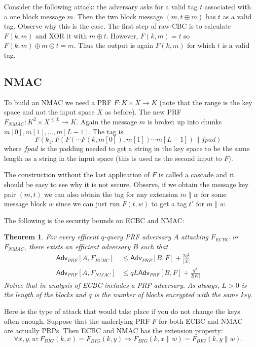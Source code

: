 \documentclass[twoside]{article}
\newcounter{lecnum}
\newtheorem{theorem}{Theorem}[lecnum]
\def\Adv{\mathsf{Adv}}
\def\xor{\oplus}
\begin{document}
Consider the following attack:
the adversary asks for a valid tag $t$ associated with a one block message $m$. Then the two block message $(m, t \xor m)$ has $t$ as a valid tag. Observe why this is the case. The first step of raw-CBC is to calculate $F(k, m)$ and XOR it with $m \xor t$. However, $F(k, m) = t$ so $F(k, m) \xor m \xor t = m$. Thus the output is again $F(k, m)$ for which $t$ is a valid tag.

\subsection{NMAC}

To build an NMAC we need a PRF $F: K \times X \rightarrow K$ (note that the range is the key space and not the input space $X$ as before). The new PRF $F_{NMAC}: K^2 \times X^{\leq L} \rightarrow K$. Again the message $m$ is broken up into chunks $m[0], m[1], ..., m[L-1]$. The tag is
\[F(k_1, F(F(\cdots F(k, m[0]), m[1]) \cdots m[L-1]) \parallel fpad)\]
where $fpad$ is the padding needed to get a string in the key space to be the same length as a string in the input space (this is used as the second input to $F$).

The construction without the last application of $F$ is called a cascade and it should be easy to see why it is not secure. Observe, if we obtain the message key pair $(m, t)$ we can also obtain the tag for any extension $m \parallel w$ for some message block $w$ since we can just run $F(t, w)$ to get a tag $t'$ for $m \parallel w$.

The following is the security bounds on ECBC and NMAC:
\begin{theorem}
For every efficent $q$-query PRF adversary $A$ attacking $F_{ECBC}$ or $F_{NMAC}$, there exists an efficient adversary $B$ such that 
\begin{align*}
\Adv_{PRF}[A, F_{ECBC}] &\leq \Adv_{PRP}[B, F] + \frac{2q^2}{|X|} \\
\Adv_{PRF}[A, F_{NMAC}] &\leq qL\Adv_{PRF}[B, F] + \frac{q^2}{2|K|}
\end{align*}
Notice that in analysis of ECBC includes a PRP adversary. As always, $L > 0$ is the length of the blocks and $q$ is the number of blocks encrypted with the same key.
\end{theorem}

Here is the type of attack that would take place if you do not change the keys often enough. Suppose that the underlying PRF $F$ for both ECBC and NMAC are actually PRPs. Then ECBC and NMAC has the extension property: 
\[\forall x, y, w: F_{BIG}(k, x) = F_{BIG}(k,y) \Rightarrow F_{BIG}(k, x \parallel w) = F_{BIG}(k, y \parallel w).\]
\end{document}
